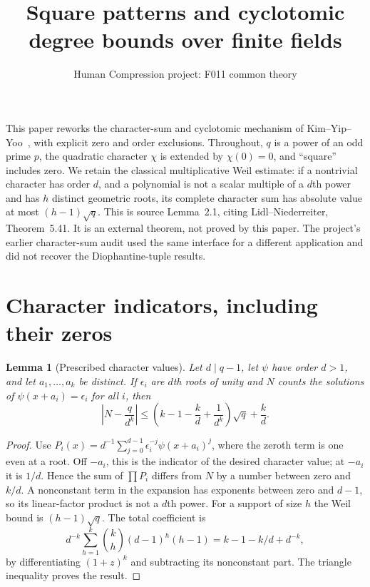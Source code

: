 \documentclass[11pt,a4paper]{article}
\title{Square patterns and cyclotomic degree bounds over finite fields}
\author{Human Compression project: F011 common theory}
\date{}
\newtheorem{lemma}[theorem]{Lemma}
\begin{document}
\maketitle
This paper reworks the character-sum and cyclotomic mechanism of
Kim--Yip--Yoo~\cite{KYY}, with explicit zero and order exclusions.
Throughout, $q$ is a power of an odd prime $p$, the quadratic character
$\chi$ is extended by $\chi(0)=0$, and ``square'' includes zero.
We retain the classical multiplicative Weil estimate: if a nontrivial
character has order $d$, and a polynomial is not a scalar multiple of a
$d$th power and has $h$ distinct geometric roots, its complete character
sum has absolute value at most $(h-1)\sqrt q$.
This is source Lemma~2.1, citing Lidl--Niederreiter, Theorem~5.41. It is an
external theorem, not proved by this paper. The project's earlier
character-sum audit used the same interface for a different
application and did not recover the Diophantine-tuple results.

\section{Character indicators, including their zeros}
\begin{lemma}[Prescribed character values]\label{patterns}
Let $d\mid q-1$, let $\psi$ have order $d>1$, and let $a_1,\ldots,a_k$
be distinct. If $\epsilon_i$ are $d$th roots of unity and $N$ counts the
solutions of $\psi(x+a_i)=\epsilon_i$ for all $i$, then
\[
 \left|N-\frac q{d^k}\right|
 \le \left(k-1-\frac kd+\frac1{d^k}\right)\sqrt q+\frac kd.
\]
\end{lemma}
\begin{proof}
Use
$P_i(x)=d^{-1}\sum_{j=0}^{d-1}\epsilon_i^{-j}\psi(x+a_i)^j$,
where the zeroth term is one even at a root. Off $-a_i$, this is the
indicator of the desired character value; at $-a_i$ it is $1/d$.
Hence the sum of $\prod P_i$ differs from $N$ by a number between zero
and $k/d$. A nonconstant term in the expansion has exponents between
zero and $d-1$, so its linear-factor product is not a $d$th power.
For a support of size $h$ the Weil bound is $(h-1)\sqrt q$.
The total coefficient is
\[
 d^{-k}\sum_{h=1}^k\binom kh(d-1)^h(h-1)
 = k-1-k/d+d^{-k},
\]
by differentiating $(1+z)^k$ and subtracting its nonconstant part.
The triangle inequality proves the result.
\end{proof}
\end{document}
